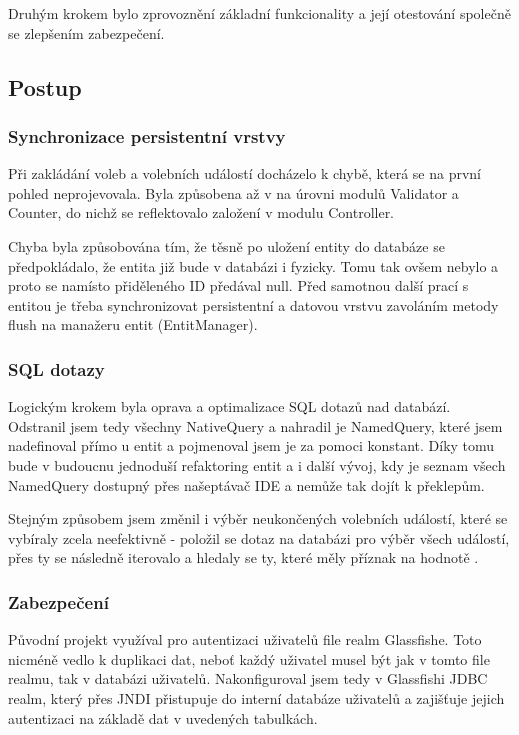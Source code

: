 \documentclass[11pt,twoside,a4paper]{book}
\begin{document}
Druhým krokem bylo zprovoznění základní funkcionality a její otestování společně se zlepšením zabezpečení.

\subsection{Postup}

\subsubsection{Synchronizace persistentní vrstvy}

Při zakládání voleb a volebních událostí docházelo k chybě, která se na první pohled neprojevovala. Byla způsobena až v na úrovni modulů Validator a Counter, do nichž se reflektovalo založení v modulu Controller. 

Chyba byla způsobována tím, že těsně po uložení entity do databáze se předpokládalo, že entita již bude v databázi i fyzicky. Tomu tak ovšem nebylo a proto se namísto přiděleného ID předával null. Před samotnou další prací s entitou je třeba synchronizovat persistentní a datovou vrstvu zavoláním metody flush na manažeru entit (EntitManager).

\subsubsection{SQL dotazy}

Logickým krokem byla oprava a optimalizace SQL dotazů nad databází. Odstranil jsem tedy všechny NativeQuery a nahradil je NamedQuery, které jsem nadefinoval přímo u entit a pojmenoval jsem je za pomoci konstant. Díky tomu bude v budoucnu jednoduší refaktoring entit a i další vývoj, kdy je seznam všech NamedQuery dostupný přes našeptávač IDE a nemůže tak dojít k překlepům.

Stejným způsobem jsem změnil i výběr neukončených volebních událostí, které se vybíraly zcela neefektivně - položil se dotaz na databázi pro výběr všech událostí, přes ty se následně iterovalo a hledaly se ty, které měly příznak  na hodnotě .

\subsubsection{Zabezpečení}

Původní projekt využíval pro autentizaci uživatelů file realm Glassfishe. Toto nicméně vedlo k duplikaci dat, neboť každý uživatel musel být jak v tomto file realmu, tak v databázi uživatelů. Nakonfiguroval jsem tedy v Glassfishi JDBC realm, který přes JNDI přistupuje do interní databáze uživatelů a zajišťuje jejich autentizaci na základě dat v uvedených tabulkách.
\end{document}
